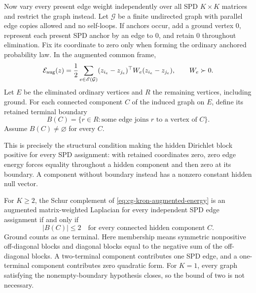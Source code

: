 Now vary every present edge weight independently over all SPD
\(K\times K\) matrices and restrict the graph instead. Let
\(\mathcal G\) be a finite undirected graph with parallel edge copies
allowed and no self-loops. If anchors occur, add a ground vertex \(0\),
represent each present SPD anchor by an edge to \(0\), and retain \(0\)
throughout elimination. Fix its coordinate to zero only when forming
the ordinary anchored probability law. In the augmented common frame,
\begin{equation}
\mathcal E_{\rm aug}(z)=
\frac12\sum_{e\in\mathscr E(\mathcal G)}
(z_{i_e}-z_{j_e})^\top W_e(z_{i_e}-z_{j_e}),\qquad W_e\succ0.
\label{eq:cg-kron-augmented-energy}
\end{equation}
Let \(E\) be the eliminated ordinary vertices and \(R\) the remaining
vertices, including ground. For each connected component \(C\) of
the induced graph on \(E\), define its retained terminal boundary
\begin{equation}
B(C)=\{r\in R:\text{some edge joins }r\text{ to a vertex of }C\}.
\label{eq:cg-kron-terminal-boundary}
\end{equation}
Assume \(B(C)\ne\varnothing\) for every \(C\).

This is precisely the structural condition making the hidden Dirichlet
block positive for
every SPD assignment: with retained coordinates zero, zero edge
energy forces equality throughout a hidden component and then zero
at its boundary. A component without boundary instead has a
nonzero constant hidden null vector. 

For \(K\geq2\), the Schur complement of \eqref{eq:cg-kron-augmented-energy}
is an augmented matrix-weighted Laplacian for every independent SPD
edge assignment if and only if
\begin{equation}
|B(C)|\leq2\quad\text{for every connected hidden component }C.
\label{eq:cg-kron-two-terminal-criterion}
\end{equation}
Ground counts as one terminal. Here membership means symmetric
nonpositive off-diagonal blocks and diagonal blocks equal to the
negative sum of the off-diagonal blocks. A two-terminal component
contributes one SPD edge, and a one-terminal component contributes
zero quadratic form. For \(K=1\), every graph satisfying the
nonempty-boundary hypothesis closes, so the bound of two is not
necessary. 

